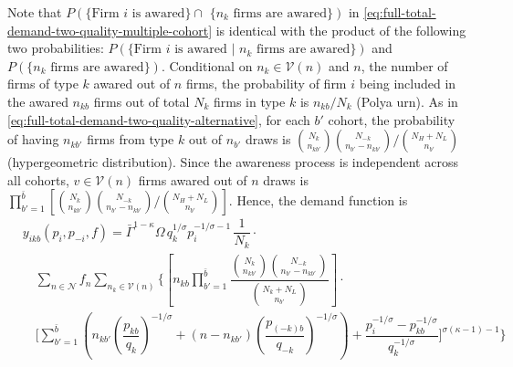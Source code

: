 \documentclass[12pt]{article}
\begin{document}
Note that $P( \text{\{Firm $i$ is awared\} $\cap$ \{$n_k$ firms are awared\}})$ in \eqref{eq:full-total-demand-two-quality-multiple-cohort} is identical with the product of the following two probabilities: $P( \text{\{Firm $i$ is awared | $n_k$ firms are awared\}})$ and $P( \text{\{$n_k$ firms are awared\}})$. Conditional on $n_{k} \in \mathcal{V}(n)$ and $n$, the number of firms of type $k$ awared out of $n$ firms, the probability of firm $i$ being included in the awared $n_{kb}$ firms out of total $N_k$ firms in type $k$ is $n_{kb} / N_{k}$ (Polya urn). As in \eqref{eq:full-total-demand-two-quality-alternative}, for each $b'$ cohort, the probability of having $n_{kb'}$ firms from type $k$ out of $n_{b'}$ draws is
$
 {\binom{N_k}{n_{kb'}} \binom{N_{-k}}{n_{b'} - n_{kb'}}}/{\binom{N_H + N_L}{n_{b'}}}
$
(hypergeometric distribution). Since the awareness process is independent across all cohorts, $v \in \mathcal{V}(n)$ firms awared out of $n$ draws is $
\prod_{b'=1}^{\bar b} \left[ {\binom{N_k}{n_{kb'}} \binom{N_{-k}}{n_{b'} - n_{kb'}}}/{\binom{N_H + N_L}{n_{b'}}} \right]$. Hence, the demand function is
\begin{equation}\label{eq:full-total-demand-two-quality-multiple-cohort-alternative}
\begin{aligned}
& y_{ikb}(p_i, p_{-i}, f) 
=  \bar{\Gamma}^{1-\kappa}\Omega \, q_k^{1/\sigma}p_i^{-1/\sigma - 1}\, \dfrac{1}{N_k} \cdot  \\ 
& \quad \sum_{n \in \mathcal{N} } f_n   \sum_{n_k \in \mathcal{V} (n) }  
\Bigg\{
\left[ n_{kb} \prod_{b'=1}^{\bar b} 
 \dfrac{\binom{N_k}{n_{kb'}} \binom{N_{-k}}{n_{b'} - n_{kb'}}}{\binom{N_k + N_L}{n_{b'}}}
\right] \cdot \\ & \quad
\Bigg[
\sum_{b' = 1}^{\bar b} 
\left(
n_{kb'} \left( \dfrac{p_{kb}}{q_{k}}   \right)^{-1/\sigma} +  
(n - n_{kb'}) \left( \dfrac{p_{(-k)b}}{q_{-k}}   \right)^{-1/\sigma} \right) + 
\dfrac{p_i^{-1/\sigma} - p^{-1/\sigma}_{kb} }{ q_k^{-1/\sigma }} 
\Bigg]^{\sigma (\kappa - 1)-1} \Bigg\}
\end{aligned}
\end{equation}
\end{document}
